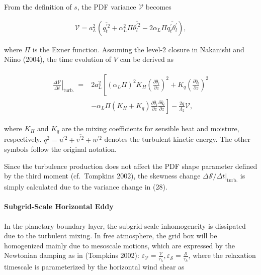 From the definition of \(s\), the PDF variance \(\mathcal{V}\) becomes

\begin{eqnarray}
\mathcal{V}=a_{L}^{2}\left(\overline{q_{t}^{\prime 2}}+\alpha_{L}^{2} \Pi \overline{\theta_{l}^{\prime 2}}-2 \alpha_{L} \Pi \overline{q_{t}^{\prime} \theta_{l}^{\prime}}\right),
\end{eqnarray}

where \(\Pi\) is the Exner function. Assuming the level-2 closure in Nakanishi and Niino (2004), the time evolution of \(V\) can be derived as

\begin{eqnarray}
\begin{aligned}
\left.\frac{\Delta \mathcal{V}}{\Delta t}\right|_{\text {turb. }}=& 2 a_{L}^{2}\left[\left(\alpha_{L} \Pi\right)^{2} K_{H}\left(\frac{\partial \bar{\theta}_{l}}{\partial z}\right)^{2}+K_{q}\left(\frac{\partial \bar{q}_{t}}{\partial z}\right)^{2}\right.\\
&\left.-\alpha_{L} \Pi\left(K_{H}+K_{q}\right) \frac{\partial \bar{\theta}_{l}}{\partial z} \frac{\partial \bar{q}_{t}}{\partial z}\right]-\frac{2 q}{\Lambda_{2}} \mathcal{V},
\end{aligned}
\label{W09-28}
\end{eqnarray}

where \(K_H\) and \(K_q\) are the mixing coefficients for sensible heat and moisture, respectively. \(q^{2}=\overline{u^{\prime 2}+v^{\prime 2}+w^{\prime 2}}\) denotes the turbulent kinetic energy.
The other symbols follow the original notation.

Since the turbulence production does not affect the PDF shape parameter defined by the third moment (cf.~Tompkins 2002), the skewness change
\(\Delta \mathcal{S} /\left.\Delta t\right|_{\text {turb.}}\) is simply calculated due to the variance change in (28).

\hypertarget{subgrid-scale-horizontal-eddy}{%
\paragraph{Subgrid-Scale Horizontal Eddy}\label{subgrid-scale-horizontal-eddy}}

In the planetary boundary layer, the subgrid-scale inhomogeneity is dissipated due to the turbulent mixing. In free atmosphere, the grid box will be homogenized mainly due to mesoscale motions, which
are expressed by the Newtonian damping as in (Tompkins 2002): \(\varepsilon_{\mathcal{V}}=\frac{\mathcal{V}}{\tau_{h}}, \varepsilon_{\mathcal{S}}=\frac{\mathcal{S}}{\tau_{h}}\), where the relaxation
timescale is parameterized by the horizontal wind shear as

